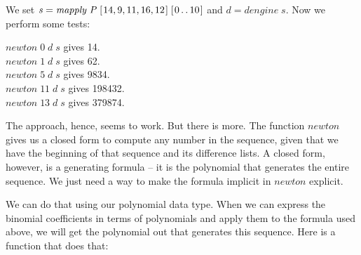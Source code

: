 \documentclass[tikz]{scrreprt}
\newcommand{\Conid}[1]{\mathit{#1}}
\newcommand{\Varid}[1]{\mathit{#1}}
\begin{document}
We set \ensuremath{\Varid{s}\mathrel{=}\Varid{mapply}\;\Conid{P}\;[\mskip1.5mu \mathrm{14},\mathrm{9},\mathrm{11},\mathrm{16},\mathrm{12}\mskip1.5mu]\;[\mskip1.5mu \mathrm{0}\mathinner{\ldotp\ldotp}\mathrm{10}\mskip1.5mu]} and \ensuremath{\Varid{d}\mathrel{=}\Varid{dengine}\;\Varid{s}}.
Now we perform some tests:

\begin{minipage}{\textwidth}
\ensuremath{\Varid{newton}\;\mathrm{0}\;\Varid{d}\;\Varid{s}} gives      14.\\
\ensuremath{\Varid{newton}\;\mathrm{1}\;\Varid{d}\;\Varid{s}} gives      62.\\
\ensuremath{\Varid{newton}\;\mathrm{5}\;\Varid{d}\;\Varid{s}} gives    9834.\\
\ensuremath{\Varid{newton}\;\mathrm{11}\;\Varid{d}\;\Varid{s}} gives  198432.\\
\ensuremath{\Varid{newton}\;\mathrm{13}\;\Varid{d}\;\Varid{s}} gives  379874.
\end{minipage}

The approach, hence, seems to work.
But there is more.
The function \ensuremath{\Varid{newton}} gives us a closed form 
to compute any number in the sequence,
given that we have the beginning of that sequence
and its difference lists.
A closed form, however, is a generating formula --
it is the polynomial that generates the entire sequence.
We just need a way to make the formula implicit in
\ensuremath{\Varid{newton}} explicit.

We can do that using our polynomial data type.
When we can express the binomial coefficients
in terms of polynomials and apply them
to the formula used above, we will get the polynomial out
that generates this sequence.
Here is a function that does that:
\end{document}
